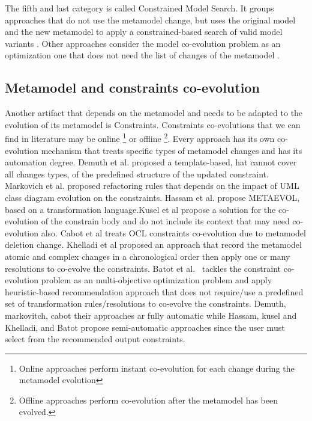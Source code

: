 The fifth and last category is called Constrained Model Search. It groups approaches that do not use the metamodel change, but uses the original model and the new metamodel to apply a constrained-based search of valid model variants \cite{demuth2016co,gomez2014approach,schonbock2014care}. Other approaches consider the model co-evolution problem as an optimization one that does not need the list of changes of the metamodel \cite{kessentini2016automated,kessentini2019automated,kessentini2020interactive}.

\subsection{Metamodel and constraints co-evolution}
Another artifact that depends on the metamodel and needs to be adapted to the evolution of its metamodel is Constraints.
 Constraints co-evolutions that we can find in literature may be online \footnote{Online approaches perform instant co-evolution for each change during the metamodel evolution} or offline \footnote{Offline approaches perform co-evolution after the metamodel has been evolved.}. Every approach has its own co-evolution mechanism that treats specific types of metamodel changes and has its automation degree. Demuth et al. \cite{10.1007/978-3-642-41533-3_18} proposed a template-based, hat cannot cover all changes types, of the predefined structure of the updated constraint. Markovich et al. \cite{markovic2008refactoring} proposed refactoring rules that depends on the impact of UML class diagram evolution on the constraints. Hassam et al. \cite{hassam2011assistance} propose METAEVOL, based on a transformation language.Kusel et al \cite{kusel2014systematic} propose a solution for the co-evolution of the constrain body and do not include its context that may need co-evolution also.
 Cabot et al \cite{cabot2004automatic} treats OCL constraints co-evolution due to metamodel deletion change. Khelladi et al \cite{khelladi2017semi} proposed an approach that record the metamodel atomic and complex changes in a chronological order then apply one or many resolutions to co-evolve the constraints. Batot et al. \cite{8101267} tackles the constraint co-evolution problem as  an multi-objective optimization problem and apply heuristic-based recommendation approach that does not require/use a predefined set of transformation rules/resolutions to co-evolve the constraints. Demuth, markovitch, cabot \cite{10.1007/978-3-642-41533-3_18,markovic2008refactoring,cabot2004automatic} their approaches ar fully automatic while Hassam, kusel and Khelladi, and Batot \cite{hassam2011assistance,kusel2014systematic,khelladi2017semi,8101267} propose semi-automatic approaches since the user must select from the recommended output constraints. 
 
